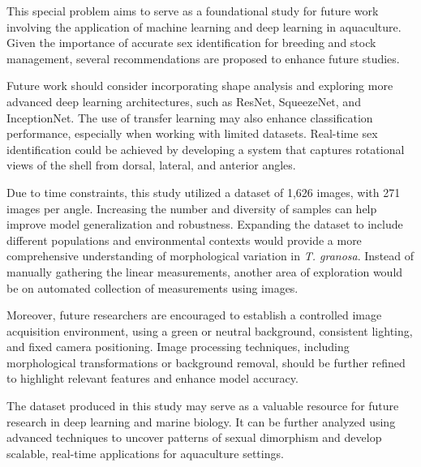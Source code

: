 This special problem aims to serve as a foundational study for future work involving the application of machine learning and deep learning in aquaculture. Given the importance of accurate sex identification for breeding and stock management, several recommendations are proposed to enhance future studies.

Future work should consider incorporating shape analysis and exploring more advanced deep learning architectures, such as ResNet, SqueezeNet, and InceptionNet. The use of transfer learning may also enhance classification performance, especially when working with limited datasets. Real-time sex identification could be achieved by developing a system that captures rotational views of the shell from dorsal, lateral, and anterior angles.

Due to time constraints, this study utilized a dataset of 1,626 images, with 271 images per angle. Increasing the number and diversity of samples can help improve model generalization and robustness. Expanding the dataset to include different populations and environmental contexts would provide a more comprehensive understanding of morphological variation in \textit{T. granosa}. Instead of manually gathering the linear measurements, another area of exploration would be on automated collection of measurements using images.

Moreover, future researchers are encouraged to establish a controlled image acquisition environment, using a green or neutral background, consistent lighting, and fixed camera positioning. Image processing techniques, including morphological transformations or background removal, should be further refined to highlight relevant features and enhance model accuracy.

The dataset produced in this study may serve as a valuable resource for future research in deep learning and marine biology. It can be further analyzed using advanced techniques to uncover patterns of sexual dimorphism and develop scalable, real-time applications for aquaculture settings.